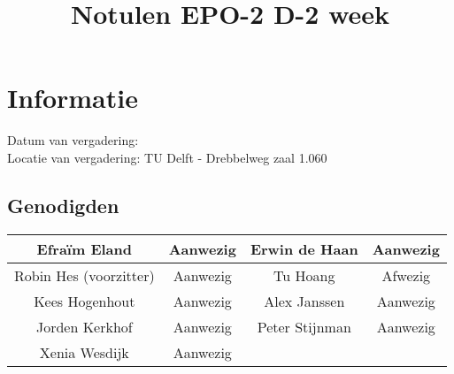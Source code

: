 \documentclass{article}
\begin{document}
\title{Notulen EPO-2 D-2 week }%
\author{}%
\maketitle

\section*{Informatie}
Datum van vergadering: \\ %
Locatie van vergadering: TU Delft - Drebbelweg zaal 1.060 %
\subsection*{Genodigden}
\begin{center}
\begin{tabular}{|c |c | c| c|}
	\hline
Efraïm Eland  & Aanwezig & Erwin de Haan & Aanwezig \\
	\hline
Robin Hes (voorzitter) & Aanwezig & Tu Hoang & Afwezig \\
	\hline
Kees Hogenhout & Aanwezig & Alex Janssen & Aanwezig\\
	\hline
Jorden Kerkhof & Aanwezig & Peter Stijnman & Aanwezig \\
	\hline
Xenia Wesdijk & Aanwezig & & \\
	\hline
\end{tabular}
\end{center}
\end{document}
